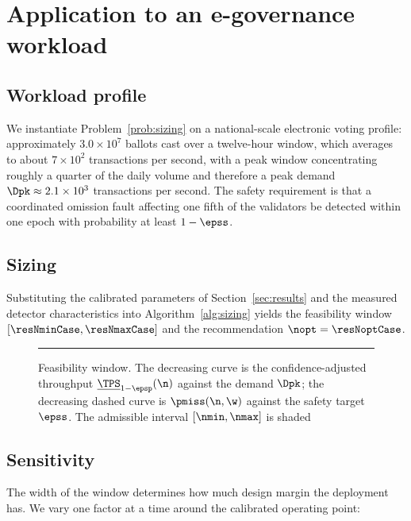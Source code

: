 \section{Application to an e-governance workload}
\label{sec:case}

\subsection{Workload profile}

We instantiate Problem~\ref{prob:sizing} on a national-scale electronic voting
profile: approximately $3.0\times10^{7}$ ballots cast over a twelve-hour
window, which averages to about $7\times10^{2}$ transactions per second, with a
peak window concentrating roughly a quarter of the daily volume and therefore a
peak demand $\Dpk\approx2.1\times10^{3}$ transactions per second. The safety
requirement is that a coordinated omission fault affecting one fifth of the
validators be detected within one epoch with probability at least
$1-\epss$.

\subsection{Sizing}

Substituting the calibrated parameters of Section~\ref{sec:results} and the
measured detector characteristics into Algorithm~\ref{alg:sizing} yields the
feasibility window $[\resNminCase,\resNmaxCase]$ and the recommendation
$\nopt=\resNoptCase$.

\begin{figure}[!t]
\centering
\rule{0.8\textwidth}{0.24\textwidth}
\caption{Feasibility window. The decreasing curve is the confidence-adjusted
throughput $\underline{\TPS}_{1-\epsp}(\n)$ against the demand $\Dpk$; the
decreasing dashed curve is $\pmiss(\n,\w)$ against the safety target $\epss$.
The admissible interval $[\nmin,\nmax]$ is shaded}
\label{fig:window}
\end{figure}

\subsection{Sensitivity}

The width of the window determines how much design margin the deployment has.
We vary one factor at a time around the calibrated operating point:

